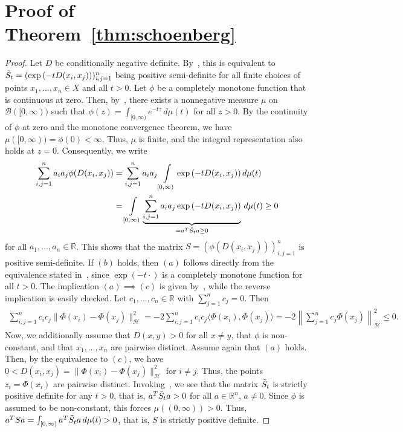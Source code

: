 \section{Proof of Theorem~\ref{thm:schoenberg}}\label{sec:proof_schoenberg}


\begin{proof}
    Let $D$ be conditionally negative definite. By~\cite[Chapter~3, Theorem~2.2]{berg_harmonic_1984}, this is equivalent to $\Tilde{S}_t=(\exp{(-tD(x_i,x_j))})_{i,j=1}^{n}$ being positive semi-definite for all finite choices of points $x_1,\dots,x_n\in X$ and all $t>0$. Let $\phi$ be a completely monotone function that is continuous at zero. Then, by~\cite[Chapter~4, Corollary~6.14]{berg_harmonic_1984}, there exists a nonnegative measure $\mu$ on $\mathcal{B}([0,\infty))$ such that $\phi(z)=\int_{[0,\infty)}e^{-tz}\,d\mu(t)$ for all $z>0$. By the continuity of $\phi$ at zero and the monotone convergence theorem, we have $\mu([0,\infty))=\phi(0)<\infty$. Thus, $\mu$ is finite, and the integral representation also holds at $z=0$. Consequently, we write
    \begin{align*}
        \sum_{i,j=1}^{n}a_ia_j\phi(D(x_i,x_j))&=\sum_{i,j=1}^{n}a_ia_j\int\limits_{[0,\infty)}\exp{(-tD(x_i,x_j))}\,d\mu(t)\\&
        =\int\limits_{[0,\infty)}\underbrace{\sum_{i,j=1}^{n}a_ia_j\exp{(-tD(x_i,x_j))}}_{=a^{T}\Tilde{S}_ta\ge0}\,d\mu(t)\ge0
    \end{align*}
    for all $a_1,\dots,a_n\in\mathbb{R}$. This shows that the matrix $S=(\phi(D(x_i,x_j)))_{i,j=1}^{n}$ is positive semi-definite. If $(b)$ holds, then $(a)$ follows directly from the equivalence stated in~\cite[Chapter~3, Theorem~2.2]{berg_harmonic_1984}, since $\exp{(-t\cdot)}$ is a completely monotone function for all $t>0$. The implication $(a)\implies(c)$ is given by~\cite[Chapter~3, Proposition~3.2]{berg_harmonic_1984}, while the reverse implication is easily checked. Let $c_1,\dots,c_n\in\mathbb{R}$ with $\sum_{j=1}^{n}c_j=0$. Then
    \begin{align*}
        \sum_{i,j=1}^{n}c_ic_j\|\Phi(x_i)-\Phi(x_j)\|_{\mathcal{H}}^2=-2\sum_{i,j=1}^{n}c_ic_j\langle\Phi(x_i),\Phi(x_j)\rangle=-2\left\|\sum_{j=1}^{n}c_j\Phi(x_j)\right\|_{\mathcal{H}}^{2}\le0.
    \end{align*}
    Now, we additionally assume that $D(x,y)>0$ for all $x\ne y$, that $\phi$ is non-constant, and that $x_1,\dots,x_n$ are pairwise distinct. Assume again that $(a)$ holds. Then, by the equivalence to $(c)$, we have $0<D(x_i,x_j)=\|\Phi(x_i)-\Phi(x_j)\|_{\mathcal{H}}^{2}$ for $i\ne j$. Thus, the points $z_i=\Phi(x_i)$ are pairwise distinct. Invoking~\cite[Theorem~3.1]{guella_gaussian_2022}, we see that the matrix $\Tilde{S}_t$ is strictly positive definite for any $t>0$, that is, $a^T\Tilde{S}_ta>0$ for all $a\in\mathbb{R}^{n}$, $a\ne0$. Since $\phi$ is assumed to be non-constant, this forces $\mu((0,\infty))>0$. Thus, $a^{T}Sa=\int_{[0,\infty)}a^{T}\Tilde{S}_ta\,d\mu(t)>0$, that is, $S$ is strictly positive definite.
\end{proof}

